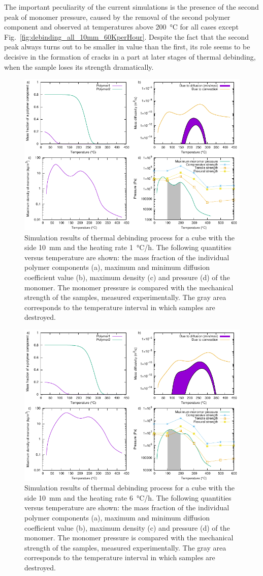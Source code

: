 \documentclass{article}
\newcommand{\ResultsCaption}[2]{
    Simulation results of thermal debinding process for a cube
    with the side \SI{#1}{\mm} and the heating rate \SI{#2}{\celsius/\hour}.
    The following quantities versus temperature are shown:
    the mass fraction of the individual polymer components (a),
    maximum and minimum diffusion coefficient value (b),
    maximum density (c) and pressure (d) of the monomer.
    The monomer pressure is compared with the mechanical strength of the samples,
    measured experimentally.
    The gray area corresponds to the temperature interval in which samples are destroyed.
}
\begin{document}
The important peculiarity of the current simulations is the presence of the second peak
of monomer pressure, caused by the removal of the second polymer component
and observed at temperatures above \SI{200}{\celsius} for all cases
except Fig.~\ref{fig:debinding_all_10mm_60KperHour}.
Despite the fact that the second peak always turns out to be smaller in value than the first, its role seems to be decisive in the formation of cracks in a part at later stages of thermal debinding, when the sample loses its strength dramatically.

\begin{figure}
    \centering
    \includegraphics[width=\textwidth]{debinding_all_10mm_1KperHour}
    \caption{\ResultsCaption{10}{1}}
    \label{fig:debinding_all_10mm_1KperHour}
\end{figure}

\begin{figure}
    \centering
    \includegraphics[width=\textwidth]{debinding_all_10mm_6KperHour}
    \caption{\ResultsCaption{10}{6}}
    \label{fig:debinding_all_10mm_6KperHour}
\end{figure}
\end{document}
